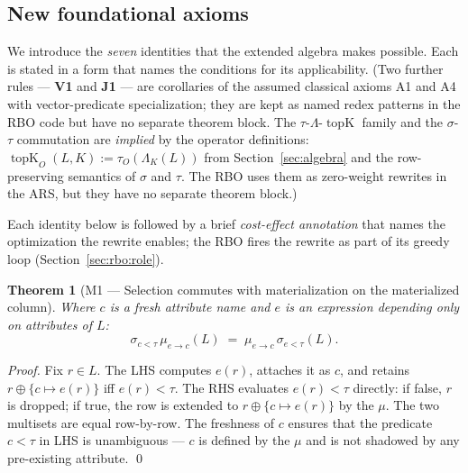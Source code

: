 \documentclass[sigconf,nonacm,review]{acmart}
\theoremstyle{plain}
\newtheorem{theorem}{Theorem}
\theoremstyle{definition}
\newcommand{\topK}{\operatorname{topK}}
\theoremstyle{remark}
\begin{document}
\subsection{New foundational axioms}\label{sec:equational:new}

We introduce the \emph{seven} identities that the extended algebra
makes possible. Each is stated in a form that names the conditions
for its applicability. (Two further rules --- \textbf{V1} and
\textbf{J1} --- are corollaries of the assumed classical axioms
A1 and A4 with vector-predicate specialization; they are kept as
named redex patterns in the RBO code but have no separate theorem
block. The $\tau$-$\Lambda$-$\topK$ family and the
$\sigma$-$\tau$ commutation are \emph{implied} by the operator
definitions: $\topK_O(L, K) := \tau_O(\Lambda_K(L))$ from
Section~\ref{sec:algebra} and the row-preserving semantics of
$\sigma$ and $\tau$. The RBO uses them as zero-weight rewrites in
the ARS, but they have no separate theorem block.)

Each identity below is followed by a brief \emph{cost-effect
annotation} that names the optimization the rewrite enables; the
RBO fires the rewrite as part of its greedy loop
(Section~\ref{sec:rbo:role}).

\begin{theorem}[M1 --- Selection commutes with materialization on the materialized column]\label{thm:m1}
Where $c$ is a fresh attribute name and $e$ is an expression
depending only on attributes of $L$:
\[
\sigma_{c < \tau}\, \mu_{e \to c}(L) \;=\; \mu_{e \to c}\, \sigma_{e < \tau}(L).
\]
\end{theorem}

\begin{proof}
Fix $r \in L$. The LHS computes $e(r)$, attaches it as $c$, and
retains $r \oplus \{c \mapsto e(r)\}$ iff $e(r) < \tau$. The RHS
evaluates $e(r) < \tau$ directly: if false, $r$ is dropped; if true,
the row is extended to $r \oplus \{c \mapsto e(r)\}$ by the $\mu$.
The two multisets are equal row-by-row. The freshness of $c$ ensures
that the predicate $c < \tau$ in LHS is unambiguous --- $c$ is defined
by the $\mu$ and is not shadowed by any pre-existing attribute.
\qed
\end{proof}
\end{document}
